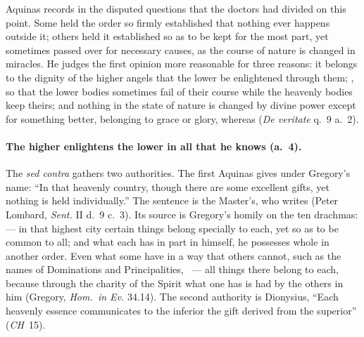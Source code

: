 Aquinas records in the disputed questions that the doctors had divided on
this point. Some held the order so firmly established that nothing ever
happens outside it; others held it established so as to be kept for the
most part, yet sometimes passed over for necessary causes, as the course of
nature is changed in miracles. He judges the first opinion more reasonable
for three reasons: it belongs to the dignity of the higher angels that the
lower be enlightened through them; , so that the lower
bodies sometimes fail of their course while the heavenly bodies keep
theirs; and nothing in the state of nature is changed by divine power except
for something better, belonging to grace or glory, whereas 
(\emph{De veritate} q.~9 a.~2).

\paragraph{The higher enlightens the lower in all that he knows (a.~4).}
The \emph{sed contra} gathers two authorities. The first Aquinas gives under
Gregory's name: ``In that heavenly country, though there are some excellent
gifts, yet nothing is held individually.'' The sentence is the Master's,
who writes  (Peter Lombard, \emph{Sent.} II d.~9
c.~3). Its source is Gregory's homily on the ten drachmas:  --- in that highest city certain things belong
specially to each, yet so as to be common to all; and what each has in part
in himself, he possesses whole in another order. Even what some have in a
way that others cannot, such as the names of Dominations and
Principalities, ~--- all things there belong to each,
because through the charity of the Spirit what one has is had by the others
in him (Gregory, \emph{Hom.\ in Ev.} 34.14). The second authority is
Dionysius, ``Each heavenly essence communicates to the inferior the gift
derived from the superior'' (\emph{CH}~15).

